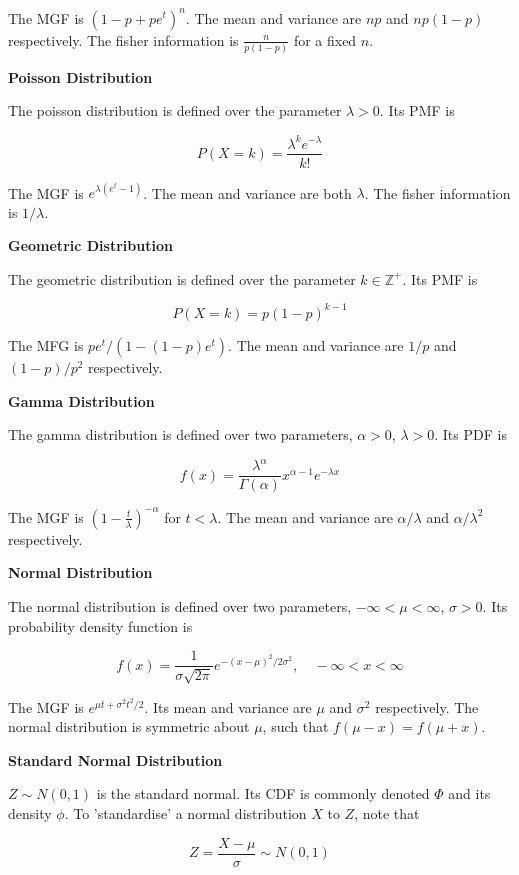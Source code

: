 \documentclass[a4paper]{article}
\newcommand{\subheading}[1]{{\scriptsize\textbf{#1}}}
\begin{document}
\begin{multicols*}{4}
The MGF is $(1-p+pe^t)^n$. The mean and variance are $np$ and $np(1-p)$
respectively. The fisher information is $\frac{n}{p(1-p)}$ for a fixed $n$.
\smallskip

\subheading{Poisson Distribution}

The poisson distribution is defined over the parameter $\lambda >0$. Its PMF is

$$P(X=k) = \frac{\lambda^k e^{-\lambda}}{k!}$$

The MGF is $e^{\lambda(e^t - 1)}$. The mean and variance are both $\lambda$. The
fisher information is $1/\lambda$. \smallskip

\subheading{Geometric Distribution}

The geometric distribution is defined over the parameter $k \in \mathbb{Z}^+$.
Its PMF is

$$P(X=k) = p(1-p)^{k-1}$$

The MFG is $pe^t/(1 - (1-p)e^t)$. The mean and variance are $1/p$ and
$(1-p)/p^2$ respectively. \smallskip

\subheading{Gamma Distribution}

The gamma distribution is defined over two parameters, $\alpha > 0$, $\lambda >
0$. Its PDF is

$$f(x) = \frac{\lambda^\alpha}{\Gamma(\alpha)} x^{\alpha-1} e^{-\lambda x}$$

The MGF is $\left ( 1 - \frac{t}{\lambda} \right )^{-\alpha}$ for $t < \lambda$.
The mean and variance are $\alpha / \lambda$ and $\alpha / \lambda^2$
respectively. \smallskip

\subheading{Normal Distribution}

The normal distribution is defined over two parameters, $-\infty < \mu <
\infty$, $\sigma > 0$. Its probability density function is

$$f(x) = \frac{1}{\sigma\sqrt{2\pi}} e^{-(x-\mu)^2 / 2\sigma^2},
  \quad -\infty < x < \infty$$

The MGF is $e^{\mu t + \sigma^2 t^2 / 2}$. Its mean and variance are $\mu$ and
$\sigma^2$ respectively. The normal distribution is symmetric about $\mu$, such
that $f(\mu - x) = f(\mu + x)$. \smallskip

\subheading{Standard Normal Distribution}

$Z \sim N(0, 1)$ is the standard normal. Its CDF is commonly denoted $\Phi$ and
its density $\phi$. To 'standardise' a normal distribution $X$ to $Z$, note that

$$Z = \frac{X - \mu}{\sigma} \sim N(0, 1)$$


\end{multicols*}
\end{document}
